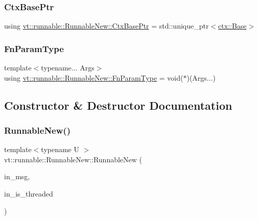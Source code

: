 \subsubsection{\texorpdfstring{Ctx\+Base\+Ptr}{CtxBasePtr}}
{\footnotesize\ttfamily using \hyperlink{structvt_1_1runnable_1_1_runnable_new_aba3112ca6cb024a32552569ef0571e20}{vt\+::runnable\+::\+Runnable\+New\+::\+Ctx\+Base\+Ptr} =  std\+::unique\+\_\+ptr$<$\hyperlink{structvt_1_1ctx_1_1_base}{ctx\+::\+Base}$>$}

\mbox{\label{structvt_1_1runnable_1_1_runnable_new_a591a5eaee30eea99711e14e050633d34}} 
\subsubsection{\texorpdfstring{Fn\+Param\+Type}{FnParamType}}
{\footnotesize\ttfamily template$<$typename... Args$>$ \\
using \hyperlink{structvt_1_1runnable_1_1_runnable_new_a591a5eaee30eea99711e14e050633d34}{vt\+::runnable\+::\+Runnable\+New\+::\+Fn\+Param\+Type} =  void($\ast$)(Args...)}



\subsection{Constructor \& Destructor Documentation}
\mbox{\label{structvt_1_1runnable_1_1_runnable_new_a47b84af69a5444b9d837a3ffe4d4792b}} 
\subsubsection{\texorpdfstring{Runnable\+New()}{RunnableNew()}\hspace{0.1cm}{\footnotesize\ttfamily [1/4]}}
{\footnotesize\ttfamily template$<$typename U $>$ \\
vt\+::runnable\+::\+Runnable\+New\+::\+Runnable\+New (\begin{DoxyParamCaption}\item[{\hyperlink{namespacevt_ab2b3d506ec8e8d1540aede826d84a239}{Msg\+Shared\+Ptr}$<$ U $>$ const \&}]{in\+\_\+msg,  }\item[{bool}]{in\+\_\+is\+\_\+threaded }\end{DoxyParamCaption})\hspace{0.3cm}{\ttfamily [inline]}}



